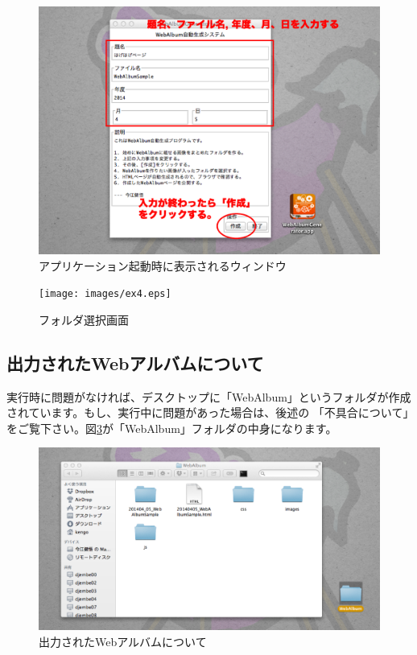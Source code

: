 \documentclass[]{jsarticle}
\begin{document}
\begin{figure}[htbp] %
 \begin{center}
  \includegraphics[width=120mm]{images/ex3.eps}
 \end{center}
 \caption{アプリケーション起動時に表示されるウィンドウ}
 \label{fig:ex3}
\end{figure}

\begin{figure}[htbp] %
 \begin{center}
  \texttt{[image: images/ex4.eps]}
 \end{center}
 \caption{フォルダ選択画面}
 \label{fig:ex4}
\end{figure}

\newpage

\subsection{出力されたWebアルバムについて}

実行時に問題がなければ、デスクトップに「WebAlbum」というフォルダが作成されています。もし、実行中に問題があった場合は、後述の
「不具合について」をご覧下さい。図\ref{fig:ex5}が「WebAlbum」フォルダの中身になります。

\begin{figure}[htbp] %
 \begin{center}
  \includegraphics[width=120mm]{images/ex5.eps}
 \end{center}
 \caption{出力されたWebアルバムについて}
 \label{fig:ex5}
\end{figure}
\end{document}
